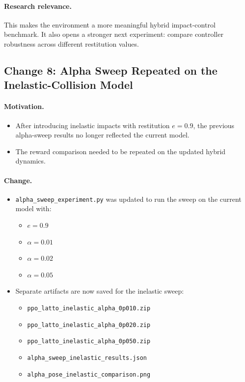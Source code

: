 \documentclass[11pt]{article}
\begin{document}
\paragraph{Research relevance.}
This makes the environment a more meaningful hybrid impact-control benchmark. It also opens a stronger next experiment: compare controller robustness across different restitution values.

\subsection*{Change 8: Alpha Sweep Repeated on the Inelastic-Collision Model}

\paragraph{Motivation.}
\begin{itemize}[leftmargin=1.5em]
  \item After introducing inelastic impacts with restitution $e = 0.9$, the previous alpha-sweep results no longer reflected the current model.
  \item The reward comparison needed to be repeated on the updated hybrid dynamics.
\end{itemize}

\paragraph{Change.}
\begin{itemize}[leftmargin=1.5em]
  \item \texttt{alpha\_sweep\_experiment.py} was updated to run the sweep on the current model with:
  \begin{itemize}[leftmargin=1.5em]
    \item $e = 0.9$
    \item $\alpha = 0.01$
    \item $\alpha = 0.02$
    \item $\alpha = 0.05$
  \end{itemize}
  \item Separate artifacts are now saved for the inelastic sweep:
  \begin{itemize}[leftmargin=1.5em]
    \item \texttt{ppo\_latto\_inelastic\_alpha\_0p010.zip}
    \item \texttt{ppo\_latto\_inelastic\_alpha\_0p020.zip}
    \item \texttt{ppo\_latto\_inelastic\_alpha\_0p050.zip}
    \item \texttt{alpha\_sweep\_inelastic\_results.json}
    \item \texttt{alpha\_pose\_inelastic\_comparison.png}
  \end{itemize}
\end{itemize}
\end{document}
